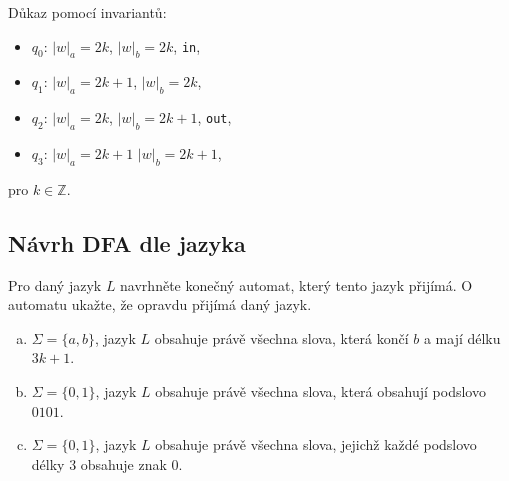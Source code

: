 \begin{multicols}{2}
    

    Důkaz pomocí invariantů: 
    \begin{itemize}[noitemsep]
        \item $q_0$: $|w|_a = 2k$, $|w|_b = 2k$, \texttt{in}, 
        \item $q_1$: $|w|_a = 2k + 1$, $|w|_b = 2k$,  
        \item $q_2$: $|w|_a = 2k$, $|w|_b = 2k + 1$, \texttt{out},  
        \item $q_3$: $|w|_a = 2k + 1$ $|w|_b = 2k+ 1$,  
    \end{itemize}
    pro $k \in \mathbb{Z}$.
    

\end{multicols}

\subsection{Návrh DFA dle jazyka}
Pro daný jazyk $L$ navrhněte konečný automat, který tento jazyk přijímá. O automatu ukažte, že opravdu přijímá daný jazyk.

\begin{enumerate}[a), noitemsep]
    \item $\Sigma = \{a,b\}$, jazyk $L$ obsahuje právě všechna slova, která končí $b$ a mají délku $3k+1$.
    \item $\Sigma = \{0,1\}$, jazyk $L$ obsahuje právě všechna slova, která obsahují podslovo $0101$.
    \item $\Sigma = \{0,1\}$, jazyk $L$ obsahuje právě všechna slova, jejichž každé podslovo délky $3$ obsahuje znak $0$.
\end{enumerate}

